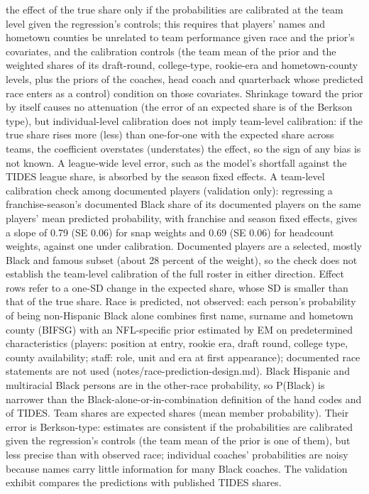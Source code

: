 {the effect of the true share only if the probabilities are calibrated at the team level given the regression's controls; this requires that players' names and hometown counties be unrelated to team performance given race and the prior's covariates, and the calibration controls (the team mean of the prior and the weighted shares of its draft-round, college-type, rookie-era and hometown-county levels, plus the priors of the coaches, head coach and quarterback whose predicted race enters as a control) condition on those covariates. Shrinkage toward the prior by itself causes no attenuation (the error of an expected share is of the Berkson type), but individual-level calibration does not imply team-level calibration: if the true share rises more (less) than one-for-one with the expected share across teams, the coefficient overstates (understates) the effect, so the sign of any bias is not known. A league-wide level error, such as the model's shortfall against the TIDES league share, is absorbed by the season fixed effects. A team-level calibration check among documented players (validation only): regressing a franchise-season's documented Black share of its documented players on the same players' mean predicted probability, with franchise and season fixed effects, gives a slope of 0.79 (SE 0.06) for snap weights and  0.69 (SE 0.06) for headcount weights, against one under calibration. Documented players are a selected, mostly Black and famous subset (about 28 percent of the weight), so the check does not establish the team-level calibration of the full roster in either direction. Effect rows refer to a one-SD change in the expected share, whose SD is smaller than that of the true share. Race is predicted, not observed: each person's probability of being non-Hispanic Black alone combines first name, surname and hometown county (BIFSG) with an NFL-specific prior estimated by EM on predetermined characteristics (players: position at entry, rookie era, draft round, college type, county availability; staff: role, unit and era at first appearance); documented race statements are not used (notes/race-prediction-design.md). Black Hispanic and multiracial Black persons are in the other-race probability, so P(Black) is narrower than the Black-alone-or-in-combination definition of the hand codes and of TIDES. Team shares are expected shares (mean member probability). Their error is Berkson-type: estimates are consistent if the probabilities are calibrated given the regression's controls (the team mean of the prior is one of them), but less precise than with observed race; individual coaches' probabilities are noisy because names carry little information for many Black coaches. The validation exhibit compares the predictions with published TIDES shares.
\par}

